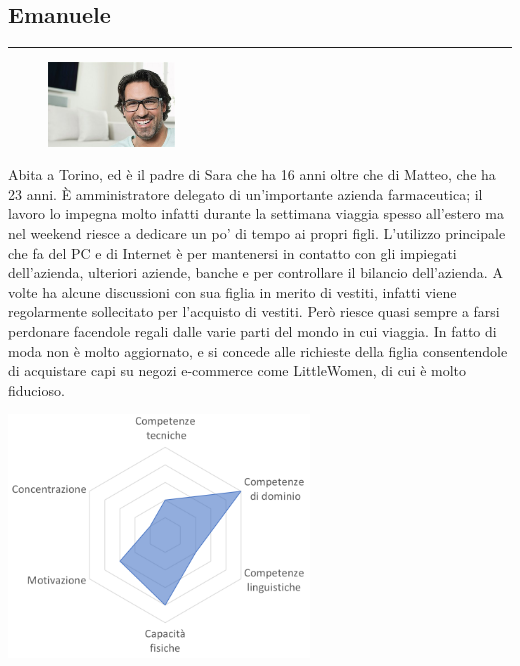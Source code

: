 \documentclass[12pt,a4paper]{report}
\begin{document}
\subsection*{Emanuele}
\rule{\textwidth}{0.5pt}
\begin{figure}
  \centering
    \includegraphics[width=0.3\textwidth]{"Images Latex/Personas/Emanuele"}
\end{figure}
Abita a Torino, ed è il padre di Sara che ha 16 anni oltre che di Matteo, che ha 23 anni. È amministratore delegato di un'importante azienda farmaceutica; il lavoro lo impegna molto infatti durante la settimana viaggia spesso all'estero ma nel weekend riesce a dedicare un po' di tempo ai propri figli. L’utilizzo principale che fa del PC e di Internet è per mantenersi in contatto con gli impiegati dell'azienda, ulteriori aziende, banche e per controllare il bilancio dell’azienda. A volte ha alcune discussioni con sua figlia in merito di vestiti, infatti viene regolarmente sollecitato per l’acquisto di vestiti. Però riesce quasi sempre a farsi perdonare facendole regali dalle varie parti del mondo in cui viaggia. In fatto di moda non è molto aggiornato, e si concede alle richieste della figlia consentendole di acquistare capi su negozi e-commerce come LittleWomen, di cui è molto fiducioso.
\begin{center}
  \includegraphics[width=0.6\textwidth]{"Images Latex/Personas/Emanuele41"}
\end{center}
\newpage
\end{document}
